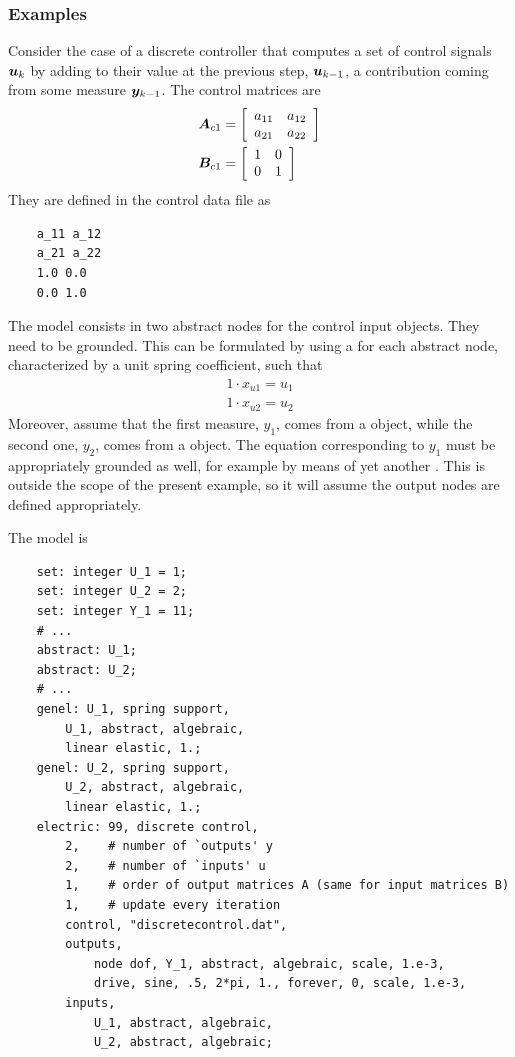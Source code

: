 \subsubsection{Examples}
Consider the case of a discrete controller that computes
a set of control signals $\T{u}_k$ by adding to their value
at the previous step, $\T{u}_{k-1}$, a contribution coming
from some measure $\T{y}_{k-1}$.
The control matrices are
\begin{subequations}
\begin{align}
	\TT{A}_{c1} &= \sqbr{\matr{cc}{
		a_{11} & a_{12} \\
		a_{21} & a_{22}
	}} \\
	\TT{B}_{c1} &= \sqbr{\matr{cc}{
		1 & 0 \\
		0 & 1
	}}
\end{align}
\end{subequations}
They are defined in the control data file  as
\begin{verbatim}
    a_11 a_12
    a_21 a_22
    1.0 0.0
    0.0 1.0
\end{verbatim}
The model consists in two abstract nodes for the control input
 objects.
They need to be grounded.
This can be formulated by using a  
for each abstract node, characterized by a unit spring coefficient,
such that
\begin{subequations}
\begin{align}
	1 \cdot x_{u1} = u_1 \\
	1 \cdot x_{u2} = u_2
\end{align}
\end{subequations}
Moreover, assume that the first measure, $y_1$,
comes from a  object,
while the second one, $y_2$, comes from a  object.
The equation corresponding to $y_1$ must be appropriately grounded
as well, for example by means of yet another 
.
This is outside the scope of the present example, so it will assume
the output nodes are defined appropriately.

The model is
\begin{verbatim}
    set: integer U_1 = 1;
    set: integer U_2 = 2;
    set: integer Y_1 = 11;
    # ...
    abstract: U_1;
    abstract: U_2;
    # ...
    genel: U_1, spring support,
        U_1, abstract, algebraic,
        linear elastic, 1.;
    genel: U_2, spring support,
        U_2, abstract, algebraic,
        linear elastic, 1.;
    electric: 99, discrete control,
        2,    # number of `outputs' y
        2,    # number of `inputs' u
        1,    # order of output matrices A (same for input matrices B)
        1,    # update every iteration
        control, "discretecontrol.dat",
        outputs,
            node dof, Y_1, abstract, algebraic, scale, 1.e-3,
            drive, sine, .5, 2*pi, 1., forever, 0, scale, 1.e-3,
        inputs,
            U_1, abstract, algebraic,
            U_2, abstract, algebraic;
\end{verbatim}




